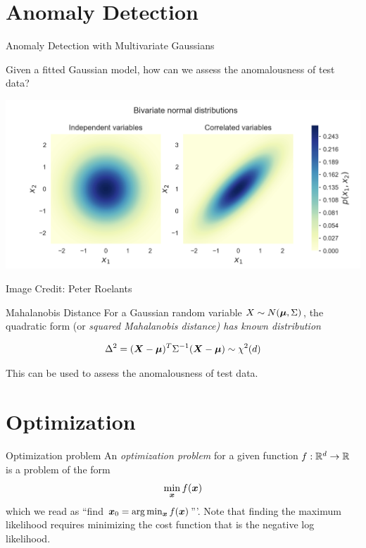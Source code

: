 \documentclass[10pt]{beamer}
\begin{document}
\section{Anomaly Detection}

\begin{frame}{Anomaly Detection with Multivariate Gaussians}

Given a fitted Gaussian model, how can we assess the anomalousness of test data?

\pause 
\begin{center}
\includegraphics[width=.6\textwidth]{images/gaussian_heatmap_independent_correlated}
\end{center}

\vfill
\hfill \tiny Image Credit: Peter Roelants
\pause

\begin{sblock}{Mahalanobis Distance}
\footnotesize
For a Gaussian random variable $X \sim N ({\boldsymbol \mu}, \Sigma)$,  the quadratic form (or \it{squared Mahalanobis distance}) has known distribution 

\[ \Delta^2 = ({\boldsymbol X} - {\boldsymbol \mu}) ^T \Sigma^{-1} ({\boldsymbol X} - {\boldsymbol \mu}) \sim \chi^2(d) \]

This can be used to assess the anomalousness of test data.
\end{sblock}

\end{frame}


\section{Optimization}

\begin{frame}{Optimization problem}
An \textit{optimization problem} for a given function $f : \mathbb{R}^d \to \mathbb{R}$ is a problem of the form 
\[ \min_{{\boldsymbol x}} f ({\boldsymbol x}) \]
which we read as ``find ${\boldsymbol x}_0 = \arg\min_{{\boldsymbol x}} f ({\boldsymbol x})$'''. 
\vfill
Note that finding the maximum likelihood requires minimizing the cost function that is the negative log likelihood.

\end{frame}
\end{document}
